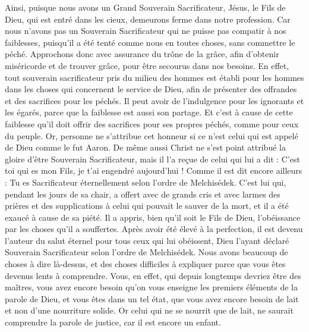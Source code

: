 \begin{multicols}{2}
Ainsi, puisque nous avons un Grand Souverain Sacrificateur, Jésus, le Fils de Dieu, qui est entré dans les cieux, demeurons ferme dans notre profession.
Car nous n'avons pas un Souverain Sacrificateur qui ne puisse pas compatir à nos faiblesses, puisqu’il a été tenté comme nous en toutes choses, sans commettre le péché.
Approchons donc avec assurance du trône de la grâce, afin d’obtenir miséricorde et de trouver grâce, pour être secourus dans nos besoins.
\VerseOne{}En effet, tout souverain sacrificateur pris du milieu des hommes est établi pour les hommes dans les choses qui concernent le service de Dieu, afin de présenter des offrandes et des sacrifices pour les péchés.
Il peut avoir de l’indulgence pour les ignorants et les égarés, parce que la faiblesse est aussi son partage.
Et c’est à cause de cette faiblesse qu’il doit offrir des sacrifices pour ses propres péchés, comme pour ceux du peuple.
Or, personne ne s'attribue cet honneur si ce n’est celui qui est appelé de Dieu comme le fut Aaron.
De même aussi Christ ne s'est point attribué la gloire d’être Souverain Sacrificateur, mais il l’a reçue de celui qui lui a dit : C’est toi qui es mon Fils, je t'ai engendré aujourd'hui !
Comme il est dit encore ailleurs : Tu es Sacrificateur éternellement selon l'ordre de Melchisédek.
C’est lui qui, pendant les jours de sa chair, a offert avec de grands cris et avec larmes des prières et des supplications à celui qui pouvait le sauver de la mort, et il a été exaucé à cause de sa piété.
Il a appris, bien qu’il soit le Fils de Dieu, l'obéissance par les choses qu'il a souffertes.
Après avoir été élevé à la perfection, il est devenu l'auteur du salut éternel pour tous ceux qui lui obéissent,
Dieu l’ayant déclaré Souverain Sacrificateur selon l'ordre de Melchisédek.
Nous avons beaucoup de choses à dire là-dessus, et des choses difficiles à expliquer parce que vous êtes devenus lents à comprendre.
Vous, en effet, qui depuis longtemps devriez être des maîtres, vous avez encore besoin qu'on vous enseigne les premiers éléments de la parole de Dieu, et vous êtes dans un tel état, que vous avez encore besoin de lait et non d’une nourriture solide.
Or celui qui ne se nourrit que de lait, ne saurait comprendre la parole de justice, car il est encore un enfant.

\end{multicols}

